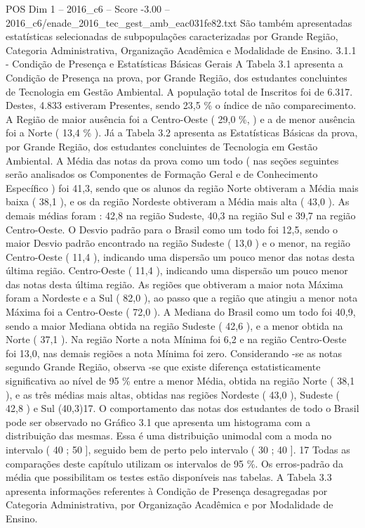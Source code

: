 \begin{textsample}{POS Dim 1 – 2016\_c6 – Score -3.00 – 2016\_c6/enade\_2016\_tec\_gest\_amb\_eac031fe82.txt}
São também apresentadas estatísticas selecionadas de subpopulações caracterizadas por Grande Região, Categoria Administrativa, Organização Acadêmica e Modalidade de Ensino. 3.1.1 - Condição de Presença e Estatísticas Básicas Gerais A Tabela 3.1 apresenta a Condição de Presença na prova, por Grande Região, dos estudantes concluintes de Tecnologia em Gestão Ambiental.
A população total de Inscritos foi de 6.317.
Destes, 4.833 estiveram Presentes, sendo 23,5 \% o índice de não comparecimento.
A Região de maior ausência foi a Centro-Oeste ( 29,0 \%, ) e a de menor ausência foi a Norte ( 13,4 \% ).
Já a Tabela 3.2 apresenta as Estatísticas Básicas da prova, por Grande Região, dos estudantes concluintes de Tecnologia em Gestão Ambiental.
A Média das notas da prova como um todo ( nas seções seguintes serão analisados os Componentes de Formação Geral e de Conhecimento Específico ) foi 41,3, sendo que os alunos da região Norte obtiveram a Média mais baixa ( 38,1 ), e os da região Nordeste obtiveram a Média mais alta ( 43,0 ).
As demais médias foram : 42,8 na região Sudeste, 40,3 na região Sul e 39,7 na região Centro-Oeste.
O Desvio padrão para o Brasil como um todo foi 12,5, sendo o maior Desvio padrão encontrado na região Sudeste ( 13,0 ) e o menor, na região Centro-Oeste ( 11,4 ), indicando uma dispersão um pouco menor das notas desta última região.
Centro-Oeste ( 11,4 ), indicando uma dispersão um pouco menor das notas desta última região.
As regiões que obtiveram a maior nota Máxima foram a Nordeste e a Sul ( 82,0 ), ao passo que a região que atingiu a menor nota Máxima foi a Centro-Oeste ( 72,0 ).
A Mediana do Brasil como um todo foi 40,9, sendo a maior Mediana obtida na região Sudeste ( 42,6 ), e a menor obtida na Norte ( 37,1 ).
Na região Norte a nota Mínima foi 6,2 e na região Centro-Oeste foi 13,0, nas demais regiões a nota Mínima foi zero.
Considerando -se as notas segundo Grande Região, observa -se que existe diferença estatisticamente significativa ao nível de 95 \% entre a menor Média, obtida na região Norte ( 38,1 ), e as três médias mais altas, obtidas nas regiões Nordeste ( 43,0 ), Sudeste ( 42,8 ) e Sul (40,3)17.
O comportamento das notas dos estudantes de todo o Brasil pode ser observado no Gráfico 3.1 que apresenta um histograma com a distribuição das mesmas.
Essa é uma distribuição unimodal com a moda no intervalo ( 40 ; 50 ], seguido bem de perto pelo intervalo ( 30 ; 40 ]. 17 Todas as comparações deste capítulo utilizam os intervalos de 95 \%.
Os erros-padrão da média que possibilitam os testes estão disponíveis nas tabelas.
A Tabela 3.3 apresenta informações referentes à Condição de Presença desagregadas por Categoria Administrativa, por Organização Acadêmica e por Modalidade de Ensino.

\end{textsample}
